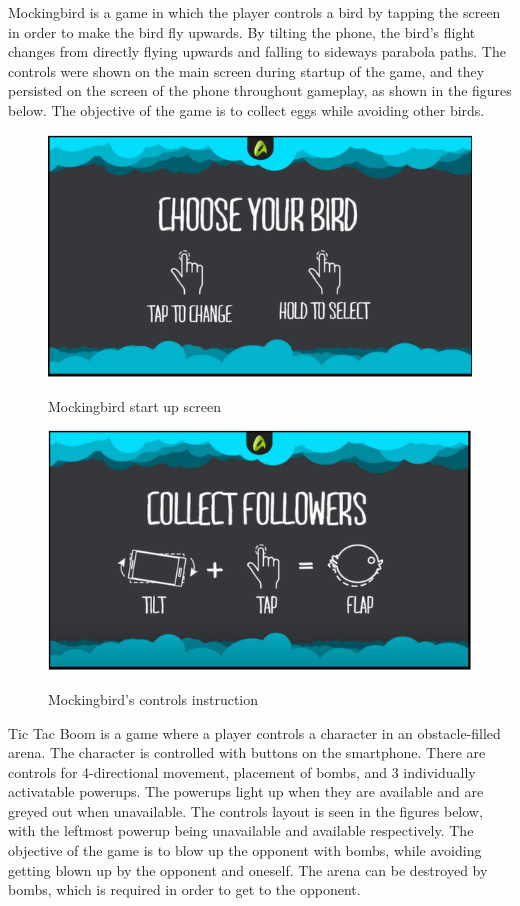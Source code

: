 Mockingbird is a game in which the player controls a bird by tapping the screen in order to make the bird fly upwards. By tilting the phone, the bird’s flight changes from directly flying upwards and falling to sideways parabola paths. The controls were shown on the main screen during startup of the game, and they persisted on the screen of the phone throughout gameplay, as shown in the figures below. The objective of the game is to collect eggs while avoiding other birds.
\begin{figure}
\centering
\includegraphics[width=\textwidth]{figures/birdSelect} \label{fig:MBird1}
\caption{Mockingbird start up screen}
\end{figure}
\begin{figure}
\centering
\includegraphics[width=\textwidth]{figures/birdPlay} \label{fig:MBird2}
\caption{Mockingbird's controls instruction}
\end{figure}

Tic Tac Boom is a game where a player controls a character in an obstacle-filled arena. The character is controlled with buttons on the smartphone. There are controls for 4-directional movement, placement of bombs, and 3 individually activatable powerups. The powerups light up when they are available and are greyed out when unavailable. The controls layout is seen in the figures below, with the leftmost powerup being unavailable and available respectively. The objective of the game is to blow up the opponent with bombs, while avoiding getting blown up by the opponent and oneself. The arena can be destroyed by bombs, which is required in order to get to the opponent.

